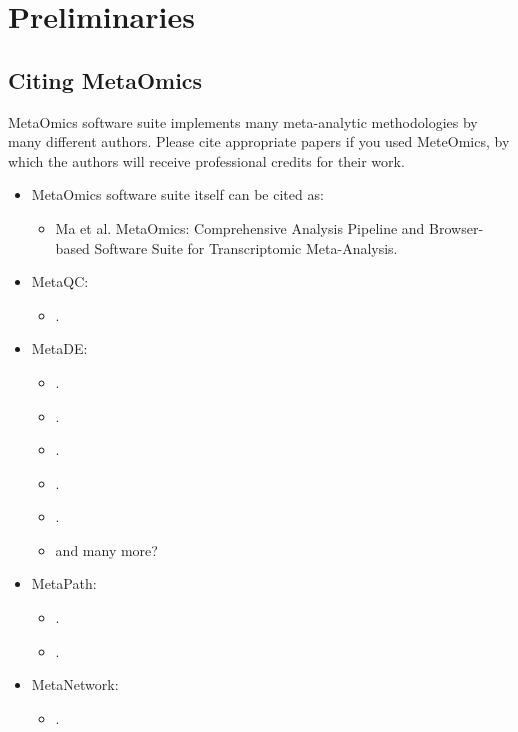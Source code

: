 \section{Preliminaries}
\subsection{Citing MetaOmics}
MetaOmics software suite implements many meta-analytic methodologies by many different authors. 
Please cite appropriate papers if you used MeteOmics,
by which the authors will receive professional credits for their work.

\begin{itemize}

\item MetaOmics software suite  itself can be cited as: 

\begin{itemize}
\item Ma et al. MetaOmics: Comprehensive Analysis Pipeline and Browser-based Software Suite for Transcriptomic Meta-Analysis.
\end{itemize}

\item MetaQC: 
\begin{itemize}
\item {}.
\end{itemize}

\item MetaDE: 
\begin{itemize}
\item {}.
\item {}.
\item {}.
\item {}.
\item {}.
\item {\color{red}and many more?}
\end{itemize}

\item MetaPath: 
\begin{itemize}
\item {}.
\item {}.
\end{itemize}

\item MetaNetwork: 
\begin{itemize}
\item {}.
\end{itemize}


\end{itemize}
